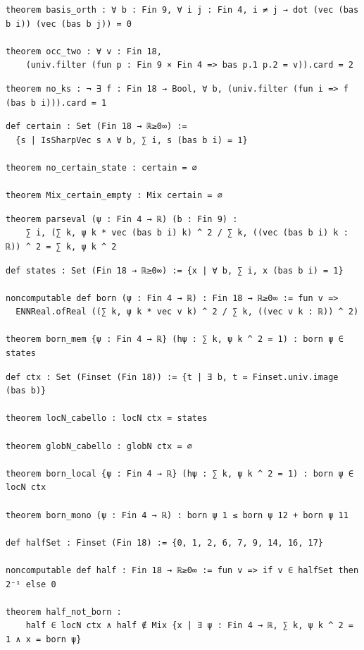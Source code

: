 \begin{lstlisting}
theorem basis_orth : ∀ b : Fin 9, ∀ i j : Fin 4, i ≠ j → dot (vec (bas b i)) (vec (bas b j)) = 0

theorem occ_two : ∀ v : Fin 18,
    (univ.filter (fun p : Fin 9 × Fin 4 => bas p.1 p.2 = v)).card = 2
\end{lstlisting}

\begin{lstlisting}
theorem no_ks : ¬ ∃ f : Fin 18 → Bool, ∀ b, (univ.filter (fun i => f (bas b i))).card = 1
\end{lstlisting}

\begin{lstlisting}
def certain : Set (Fin 18 → ℝ≥0∞) :=
  {s | IsSharpVec s ∧ ∀ b, ∑ i, s (bas b i) = 1}

theorem no_certain_state : certain = ∅

theorem Mix_certain_empty : Mix certain = ∅
\end{lstlisting}

\begin{lstlisting}
theorem parseval (ψ : Fin 4 → ℝ) (b : Fin 9) :
    ∑ i, (∑ k, ψ k * vec (bas b i) k) ^ 2 / ∑ k, ((vec (bas b i) k : ℝ)) ^ 2 = ∑ k, ψ k ^ 2
\end{lstlisting}

\begin{lstlisting}
def states : Set (Fin 18 → ℝ≥0∞) := {x | ∀ b, ∑ i, x (bas b i) = 1}

noncomputable def born (ψ : Fin 4 → ℝ) : Fin 18 → ℝ≥0∞ := fun v =>
  ENNReal.ofReal ((∑ k, ψ k * vec v k) ^ 2 / ∑ k, ((vec v k : ℝ)) ^ 2)

theorem born_mem {ψ : Fin 4 → ℝ} (hψ : ∑ k, ψ k ^ 2 = 1) : born ψ ∈ states
\end{lstlisting}

\begin{lstlisting}
def ctx : Set (Finset (Fin 18)) := {t | ∃ b, t = Finset.univ.image (bas b)}

theorem locN_cabello : locN ctx = states

theorem globN_cabello : globN ctx = ∅

theorem born_local {ψ : Fin 4 → ℝ} (hψ : ∑ k, ψ k ^ 2 = 1) : born ψ ∈ locN ctx

theorem born_mono (ψ : Fin 4 → ℝ) : born ψ 1 ≤ born ψ 12 + born ψ 11

def halfSet : Finset (Fin 18) := {0, 1, 2, 6, 7, 9, 14, 16, 17}

noncomputable def half : Fin 18 → ℝ≥0∞ := fun v => if v ∈ halfSet then 2⁻¹ else 0

theorem half_not_born :
    half ∈ locN ctx ∧ half ∉ Mix {x | ∃ ψ : Fin 4 → ℝ, ∑ k, ψ k ^ 2 = 1 ∧ x = born ψ}
\end{lstlisting}

